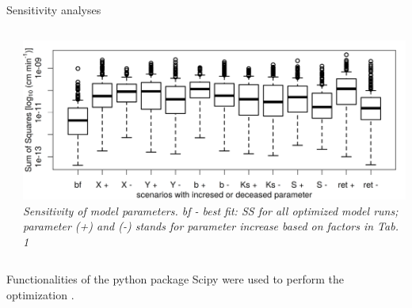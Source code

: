 \begin{block}{Sensitivity analyses}
\begin{columns}
\begin{column}{0.25\textwidth}
\begin{table}[]
        \end{table}
    \end{column}
    \begin{column}{0.5\textwidth}
        \includegraphics[width = \textwidth]{obr/sens.png}
        {\it Sensitivity of model parameters. bf - best fit: SS for all optimized model runs; parameter (+) and (-) stands for parameter increase based on factors in Tab. 1}
    \end{column}
\end{columns}
Functionalities of the python package Scipy were used to perform the optimization \citep{scipy}.
\end{block}

% 
